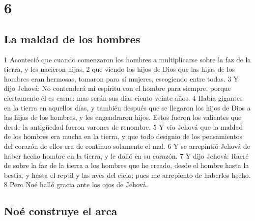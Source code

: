 \chapter{6}

\section{La maldad de los hombres}

1 Aconteció que cuando comenzaron los hombres a multiplicarse sobre la faz de la tierra, y les nacieron hijas,
2 que viendo los hijos de Dios que las hijas de los hombres eran hermosas, tomaron para sí mujeres, escogiendo entre todas.
3 Y dijo Jehová: No contenderá mi espíritu con el hombre para siempre, porque ciertamente él es carne; mas serán sus días ciento veinte años.
4 Había gigantes en la tierra en aquellos días, y también después que se llegaron los hijos de Dios a las hijas de los hombres, y les engendraron hijos. Estos fueron los valientes que desde la antigüedad fueron varones de renombre.
5 Y vio Jehová que la maldad de los hombres era mucha en la tierra, y que todo designio de los pensamientos del corazón de ellos era de continuo solamente el mal.
6 Y se arrepintió Jehová de haber hecho hombre en la tierra, y le dolió en su corazón.
7 Y dijo Jehová: Raeré de sobre la faz de la tierra a los hombres que he creado, desde el hombre hasta la bestia, y hasta el reptil y las aves del cielo; pues me arrepiento de haberlos hecho.
8 Pero Noé halló gracia ante los ojos de Jehová.

\section{Noé construye el arca}

